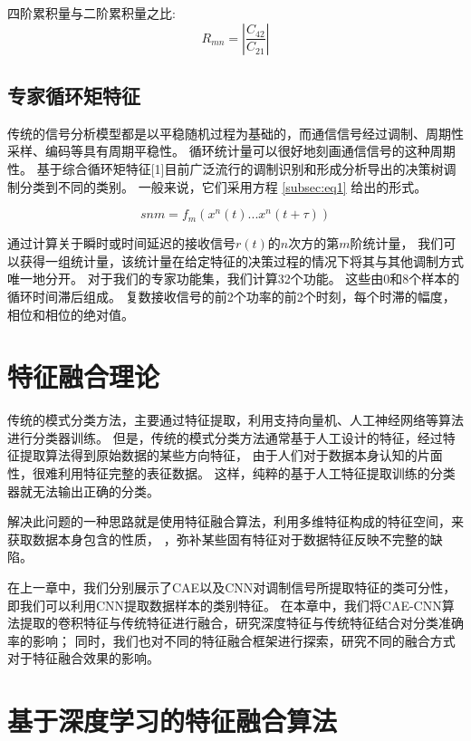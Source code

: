 四阶累积量与二阶累积量之比:
\begin{equation}
R_{mn} = |\frac{C_{42}}{C_{21}}|
\end{equation}
 

\subsection{专家循环矩特征}

传统的信号分析模型都是以平稳随机过程为基础的，而通信信号经过调制、周期性采样、编码等具有周期平稳性。
循环统计量可以很好地刻画通信信号的这种周期性。
基于综合循环矩特征[1]目前广泛流行的调制识别和形成分析导出的决策树调制分类到不同的类别。 
一般来说，它们采用方程 \ref{subsec:eq1} 给出的形式。

\begin{equation}
\label{subsec:eq1}
snm = f_{m}(x^{n}(t)...x^{n}(t + \tau))
\end{equation}

通过计算关于瞬时或时间延迟的接收信号$r(t)$的$n$次方的第$m$阶统计量，
我们可以获得一组统计量，该统计量在给定特征的决策过程的情况下将其与其他调制方式唯一地分开。 
对于我们的专家功能集，我们计算32个功能。 这些由0和8个样本的循环时间滞后组成。 
复数接收信号的前2个功率的前2个时刻，每个时滞的幅度，相位和相位的绝对值。\par


\section{特征融合理论}
传统的模式分类方法，主要通过特征提取，利用支持向量机、人工神经网络等算法进行分类器训练。 
但是，传统的模式分类方法通常基于人工设计的特征，经过特征提取算法得到原始数据的某些方向特征，
由于人们对于数据本身认知的片面性，很难利用特征完整的表征数据。
这样，纯粹的基于人工特征提取训练的分类器就无法输出正确的分类。\par

解决此问题的一种思路就是使用特征融合算法，利用多维特征构成的特征空间，来获取数据本身包含的性质，
，弥补某些固有特征对于数据特征反映不完整的缺陷。\par

在上一章中，我们分别展示了CAE以及CNN对调制信号所提取特征的类可分性，即我们可以利用CNN提取数据样本的类别特征。
在本章中，我们将CAE-CNN算法提取的卷积特征与传统特征进行融合，研究深度特征与传统特征结合对分类准确率的影响；
同时，我们也对不同的特征融合框架进行探索，研究不同的融合方式对于特征融合效果的影响。\par

\section{基于深度学习的特征融合算法}

